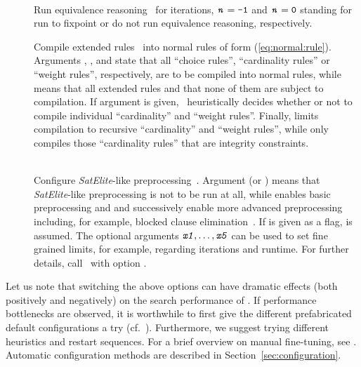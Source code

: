 \begin{description}
  \item[]~\\
    Run equivalence reasoning~\cite{gekanesc08a} for  iterations,
    $\texttt{\textit{n}}=\texttt{-1}$ and $\texttt{\textit{n}}=\texttt{0}$ standing for
    run to fixpoint or do not run equivalence reasoning, respectively.
  \item[]
    Compile extended rules~\cite{siniso02a} into normal rules of form (\ref{eq:normal:rule}).
    Arguments ,  , and 
    state that all ``choice rules'', ``cardinality rules'' or ``weight rules'', respectively,
    are to be compiled into normal rules,
    while  means that all extended rules and  that none of them
    are subject to compilation. If argument  is given,
    \clasp\ heuristically decides whether or not to compile individual
    ``cardinality'' and ``weight rules''.
    Finally,  limits compilation to recursive ``cardinality'' and ``weight rules'',
    while  only compiles those ``cardinality rules'' that are integrity constraints.
  \item[]~\\
    Configure \emph{SatElite}-like preprocessing~\cite{eenbie05a}.
    Argument  (or ) means that \emph{SatElite}-like preprocessing is not to be run at all,
    while  enables basic preprocessing and  and  successively enable more
    advanced preprocessing including, for example, blocked clause elimination~\cite{jabihe10a}.
    If  is given as a flag,  is assumed.
    The optional arguments $\texttt{\textit{x1}},\ldots,\texttt{\textit{x5}}$ can be used
    to set fine grained limits, for example, regarding iterations and runtime.
    For further details, call \clasp\ with option .

\end{description}

Let us note that switching the above options can have dramatic effects
(both positively and negatively) on the search performance of \clasp.
If performance bottlenecks are observed, it is worthwhile to first
give the different prefabricated default configurations a try (cf.\ ).
Furthermore, we suggest trying different heuristics and restart sequences.
For a brief overview on manual fine-tuning, see \cite{gekasc09b}.
Automatic configuration methods are described in Section~\ref{sec:configuration}.


